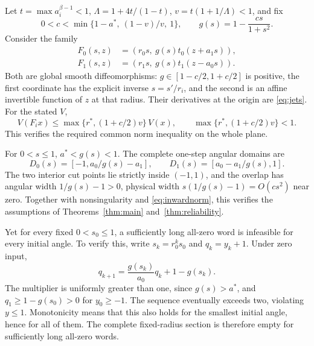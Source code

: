 \documentclass[11pt]{amsart}
\theoremstyle{definition}
\theoremstyle{remark}
\numberwithin{equation}{section}
\begin{document}
Let \(t=\max a_i^{\beta-1}<1\),
\(\Lambda=1+4t/(1-t)\), \(v=t(1+1/\Lambda)<1\), and fix
\[
       0<c<\min\{1-a^*,\ (1-v)/v,\ 1\},\qquad
       g(s)=1-\frac{cs}{1+s^2}.
\]
Consider the family
\begin{equation}
\begin{split}
 F_0(s,z)&=(r_0s,\ g(s)t_0(z+a_1s)),\\
 F_1(s,z)&=(r_1s,\ g(s)t_1(z-a_0s)).                         \label{eq:inward}
\end{split}
\end{equation}
Both are global smooth diffeomorphisms: \(g\in[1-c/2,1+c/2]\)
is positive, the first coordinate has the explicit inverse
\(s=s'/r_i\), and the second is an affine invertible function of
\(z\) at that radius. Their derivatives at the origin are \eqref{eq:jets}.
For the stated \(V\),
\begin{equation}
V(F_i x)\le\max\{r^*,(1+c/2)v\}\,V(x),
 \qquad \max\{r^*,(1+c/2)v\}<1.                            \label{eq:inwardnorm}
\end{equation}
This verifies the required common norm inequality on the whole
plane.

For \(0<s\le1\), \(a^*<g(s)<1\). The complete one-step angular
domains are
\begin{equation}
D_0(s)=[-1,a_0/g(s)-a_1],\qquad
 D_1(s)=[a_0-a_1/g(s),1].                                   \label{eq:inwarddomains}
\end{equation}
The two interior cut points lie strictly inside \((-1,1)\), and the overlap
has angular width \(1/g(s)-1>0\), physical width
\(s(1/g(s)-1)=O(cs^2)\) near zero. Together with nonsingularity
and \eqref{eq:inwardnorm}, this verifies the assumptions of
Theorems~\ref{thm:main} and~\ref{thm:reliability}.

Yet for every fixed \(0<s_0\le1\), a sufficiently long all-zero word
is infeasible for every initial angle. To verify this, write
\(s_k=r_0^ks_0\) and \(q_k=y_k+1\). Under zero input,
\begin{equation}
q_{k+1}=\frac{g(s_k)}{a_0}q_k+1-g(s_k).                    \label{eq:inwardrecursion}
\end{equation}
The multiplier is uniformly greater than one, since
\(g(s)>a^*\), and \(q_1\ge1-g(s_0)>0\) for \(y_0\ge-1\).
The sequence eventually exceeds two, violating \(y\le1\).
Monotonicity means that this also holds for the smallest initial
angle, hence for all of them. The complete fixed-radius section
is therefore empty for sufficiently long all-zero words.
\end{document}
